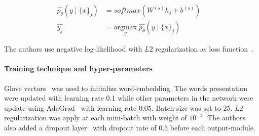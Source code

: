 \begin{align}
  	\hat{p_{\theta}}(y \mid \{x\}_j ) &= softmax( W^{(s)} h_j + b^{(s)}) & \\
  	\hat{y_j} &= \underset{y}{\mathrm{argmax}} \; \hat{p_{\theta}}(y \mid \{x\}_j ) &
\end{align}

The authors use negative log-likelihood with \(L2\) regularization as loss function~\cite{treeLSTM}.

\paragraph{Training technique and hyper-parameters}
Glove vectors~\cite{glove} was used to initialize word-embedding. 
The words presentation were updated with learning rate 0.1 while other parameters in the network were update using AdaGrad~\cite{adagrad} with learning rate 0.05. 
Batch-size was set to 25. 
\(L2\) regularization was apply at each mini-batch with weight of \(10^{-4}\).
The authors also added a dropout layer~\cite{dropout} with dropout rate of \(0.5\) before each output-module.

